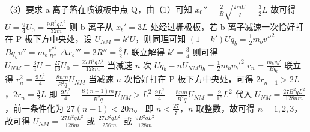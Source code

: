 \documentclass[\gkver]{gaokaozhenti}
\begin{document}
\begin{enumerate}
{（3）要求 a 离子落在喷镀板中点 Q，由（1）可知 $x_{0}'' = \frac{2}{B}\sqrt{\frac{2mU}{q}} = \frac{3}{2}L$
故可得 $U = \frac{9}{4}U_{0} = \frac{9B^{2}qL^{2}}{32m}$
则 b 离子从 $x_{b}' = 3L$ 处经过栅极板，若 b 离子减速一次恰好打在 P 板下方中央处，设 $U_{NM} = k'U$，则同理可知
$(1 - k')Uq_{b} = \frac{1}{2}m_{b}v''^{2}$
$Bq_{b}v'' = m_{b}\frac{v''^{2}}{R''}$
$\Delta x_{b}''' = 2R'' = \frac{3}{2}L$
联立解得 $k' = \frac{3}{4}$
则可得 $U_{NM} = \frac{3}{4}U = \frac{27}{16}U_{0} = \frac{27B^{2}qL^{2}}{128m}$
当减速 $n$ 次
$Uq_{b} - nU_{NM}q_{b} = \frac{1}{2}m_{b}v_{b}'^{2}$
$r_{n} = \frac{m_{b}v_{b}'}{Bq_{b}}$
联立得 $r_{n}^{2} = \frac{9L^{2}}{4} - \frac{8nm}{B^{2}q}U_{NM}$
当减速 $n$ 次恰好打在 P 板下方中央处，可得 $2r_{n-1} > 2L$，$2r_{n} = \frac{3}{2}L$
即 $\frac{9L^{2}}{4} - \frac{8(n - 1)m}{B^{2}q}U_{NM} > L^{2}$
$\frac{9L^{2}}{4} - \frac{8nm}{B^{2}q}U_{NM} = \frac{9}{16}L^{2}$
代入 $U_{NM}=\frac{27B^{2}qL^{2}}{128nm}$，前一条件化为 $27(n-1)<20n$。
即 $n < \frac{27}{7}$，$n$ 取整数，故可得 $n = 1,2,3$，故可得
$U_{NM} = \frac{27B^{2}qL^{2}}{128m}$ 或 $\frac{27B^{2}qL^{2}}{256m}$ 或 $\frac{9B^{2}qL^{2}}{128m}$
}

\end{enumerate}
\end{document}
